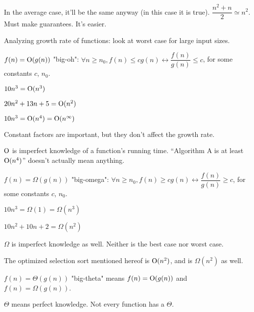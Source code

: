 In the average case, it'll be the same anyway (in this case it is true). $\dfrac{n^2 + n}{2} \simeq n^2$. Must make guarantees. It's easier.


Analyzing growth rate of functions: look at worst case for large input sizes.

\begin{defn}
$f(n) = {\rm O}(g(n))$ "big-oh": $\forall n \geq n_0, f(n) \leq cg(n) \leftrightarrow \dfrac{f(n)}{g(n)} \leq c$, for some constants $c$, $n_0$.
\end{defn}

\begin{ex}
$10n^3 = {\rm O}(n^3)$
\end{ex}

\begin{ex}
$20n^2 + 13n + 5 = {\rm O}(n^2)$
\end{ex}

\begin{ex}
$10n^3 = {\rm O}(n^4) = {\rm O}(n^\infty)$
\end{ex}

Constant factors are important, but they don't affect the growth rate.

${\rm O}$ is imperfect knowledge of a function's running time. ``Algorithm A is at least ${\rm O}(n^4)$'' doesn't actually mean anything.

\begin{defn}
$f(n) = \Omega (g(n))$ "big-omega": $\forall n \geq n_0, f(n) \geq cg(n) \leftrightarrow \dfrac{f(n)}{g(n)} \geq c$, for some constants $c$, $n_0$.
\end{defn}

\begin{ex}
$10n^3 = \Omega(1) = \Omega(n^3)$
\end{ex}

\begin{ex}
$10n^2 + 10n + 2 = \Omega(n^2)$
\end{ex}

$\Omega$ is imperfect knowledge as well. Neither is the best case nor worst case.

The optimized selection sort mentioned hereof is ${\rm O}(n^2)$, and is $\Omega(n^2)$ as well.

\begin{defn}
$f(n) = \Theta(g(n))$ "big-theta" means $f(n) = {\rm O}(g(n))$ and $f(n) = \Omega(g(n))$.
\end{defn}

$\Theta$ means perfect knowledge. Not every function has a $\Theta$.
